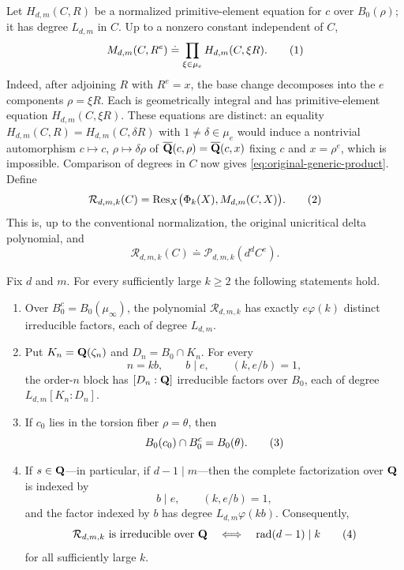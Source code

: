 Let $H_{d,m}(C,R)$ be a normalized primitive-element equation for
$c$ over $B_0(\rho)$; it has degree $L_{d,m}$ in $C$.  Up to a nonzero
constant independent of $C$,
\[
 M_{d,m}(C,R^e)
 \doteq
 \prod_{\xi\in\mu_e}H_{d,m}(C,\xi R).
 \numberthis\label{eq:original-generic-product}
\]
Indeed, after adjoining $R$ with $R^e=x$, the base change decomposes
into the $e$ components $\rho=\xi R$.  Each is geometrically integral
and has primitive-element equation $H_{d,m}(C,\xi R)$.  These equations
are distinct: an equality
$H_{d,m}(C,R)=H_{d,m}(C,\delta R)$ with
$1\ne\delta\in\mu_e$ would induce a nontrivial automorphism
$c\mapsto c$, $\rho\mapsto\delta\rho$ of
$\overline{\mathbf Q}(c,\rho)=\overline{\mathbf Q}(c,x)$ fixing $c$ and
$x=\rho^e$, which is impossible.  Comparison of degrees in $C$ now
gives \eqref{eq:original-generic-product}.
Define
\[
 \mathcal R_{d,m,k}(C)
 =\Res_X\bigl(\Phi_k(X),M_{d,m}(C,X)\bigr).
 \numberthis\label{eq:original-resultant}
\]
This is, up to the conventional normalization, the original
unicritical delta polynomial, and
\[
 \mathcal R_{d,m,k}(C)
 \doteq \mathcal P_{d,m,k}(d^dC^e).
\]

\begin{theorem}
\label{thm:original-parameter-factorization}
Fix $d$ and $m$.  For every sufficiently large $k\ge2$ the following
statements hold.

\begin{enumerate}[label=\textup{(\roman*)}]
\item Over $B_0^c=B_0(\mu_\infty)$, the polynomial
      $\mathcal R_{d,m,k}$ has exactly $e\varphi(k)$ distinct
      irreducible factors, each of degree $L_{d,m}$.
\item Put $K_n=\mathbf Q(\zeta_n)$ and $D_n=B_0\cap K_n$.  For every
      \[
       n=kb,\qquad b\mid e,\qquad (k,e/b)=1,
      \]
      the order-$n$ block has $[D_n:\mathbf Q]$ irreducible factors over
      $B_0$, each of degree $L_{d,m}[K_n:D_n]$.
\item If $c_0$ lies in the torsion fiber $\rho=\theta$, then
      \[
       B_0(c_0)\cap B_0^c=B_0(\theta).
       \numberthis\label{eq:original-intersection}
      \]
\item If $s\in\mathbf Q$---in particular, if $d-1\mid m$---then the complete
      factorization over $\mathbf Q$ is indexed by
      \[
       b\mid e,\qquad (k,e/b)=1,
      \]
      and the factor indexed by $b$ has degree
      $L_{d,m}\varphi(kb)$.  Consequently,
      \[
       \mathcal R_{d,m,k}\text{ is irreducible over }\Q
       \quad\Longleftrightarrow\quad
       \operatorname{rad}(d-1)\mid k
       \numberthis\label{eq:original-radical-criterion}
      \]
      for all sufficiently large $k$.
\end{enumerate}
\end{theorem}

